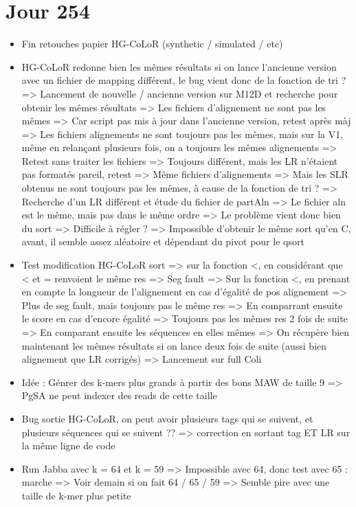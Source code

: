 \documentclass[12pt]{report}
\begin{document}
\section{Jour 254}

\begin{itemize}
	\item Fin retouches papier HG-CoLoR (synthetic / simulated / etc)
	
	\item HG-CoLoR redonne bien les mêmes résultats si on lance l'ancienne version avec un fichier de mapping différent,
		  le bug vient donc de la fonction de tri ?
		  => Lancement de nouvelle / ancienne version sur M12D et recherche pour obtenir les mêmes résultats
		  => Les fichiers d'alignement ne sont pas les mêmes
		  	=> Car script pas mis à jour dans l'ancienne version, retest après màj
		  	=> Les fichiers alignements ne sont toujours pas les mêmes, mais sur la V1, même en relançant plusieurs fois, on a toujours les mêmes alignements
		  	=> Retest sans traiter les fichiers
		  	=> Toujours différent, mais les LR n'étaient pas formatés pareil, retest 
		  	=> Même fichiers d'alignements
		 => Mais les SLR obtenus ne sont toujours pas les mêmes, à cause de la fonction de tri ?
		 => Recherche d'un LR différent et étude du fichier de partAln
		 	=> Le fichier aln est le même, mais pas dans le même ordre
		 	=> Le problème vient donc bien du sort
		 	=> Difficile à régler ?
		 => Impossible d'obtenir le même sort qu'en C, avant, il semble assez aléatoire et dépendant du pivot pour le qsort
		  
	\item Test modification HG-CoLoR sort 
		  => sur la fonction <, en considérant que < et = renvoient le même res
		  	=> Seg fault
		  => Sur la fonction <, en prenant en compte la longueur de l'alignement en cas d'égalité de pos alignement
		  	=> Plus de seg fault, mais toujours pas le même res
		  => En comparrant ensuite le score en cas d'encore égalité
			=> Toujours pas les mêmes res 2 fois de suite
		  => En comparant ensuite les séquences en elles mêmes
		  => On récupère bien maintenant les mêmes résultats si on lance deux fois de suite (aussi bien alignement que LR corrigés)
		  => Lancement sur full Coli
	
	\item Idée : Génrer des k-mers plus grands à partir des bons MAW de taille 9
		  => PgSA ne peut indexer des reads de cette taille		  
		  
	\item Bug sortie HG-CoLoR, on peut avoir plusieurs tags qui se suivent, et plusieurs séquences qui se suivent ??
		  => correction en sortant tag ET LR sur la même ligne de code
		  
	\item Run Jabba avec k = 64 et k = 59 => Impossible avec 64, donc test avec 65 : marche
		  => Voir demain si on fait 64 / 65 / 59
		  => Semble pire avec une taille de k-mer plus petite
\end{itemize}
\end{document}
